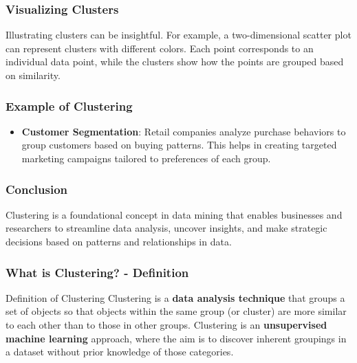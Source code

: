 \documentclass{beamer}
\begin{document}
\begin{frame}[fragile]
    \frametitle{Visualizing Clusters}
    Illustrating clusters can be insightful. For example, a two-dimensional scatter plot can represent clusters with different colors. Each point corresponds to an individual data point, while the clusters show how the points are grouped based on similarity.
\end{frame}

\begin{frame}[fragile]
    \frametitle{Example of Clustering}
    \begin{itemize}
        \item \textbf{Customer Segmentation}: Retail companies analyze purchase behaviors to group customers based on buying patterns. This helps in creating targeted marketing campaigns tailored to preferences of each group.
    \end{itemize}
\end{frame}

\begin{frame}[fragile]
    \frametitle{Conclusion}
    Clustering is a foundational concept in data mining that enables businesses and researchers to streamline data analysis, uncover insights, and make strategic decisions based on patterns and relationships in data.
\end{frame}

\begin{frame}[fragile]
    \frametitle{What is Clustering? - Definition}
    \begin{block}{Definition of Clustering}
        Clustering is a \textbf{data analysis technique} that groups a set of objects so that objects within the same group (or cluster) are more similar to each other than to those in other groups. 
        Clustering is an \textbf{unsupervised machine learning} approach, where the aim is to discover inherent groupings in a dataset without prior knowledge of those categories.
    \end{block}
\end{frame}
\end{document}
